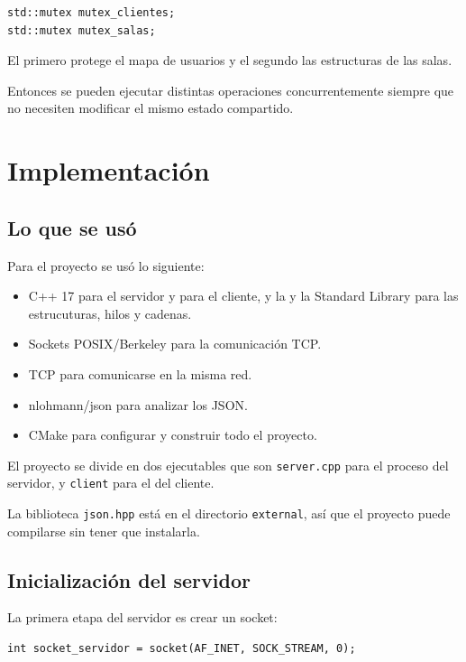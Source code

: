 \documentclass[12pt,letterpaper]{article}
\begin{document}
\begin{lstlisting}[style=cppstyle]
std::mutex mutex_clientes;
std::mutex mutex_salas;
\end{lstlisting}

El primero protege el mapa de usuarios y el segundo las estructuras de las salas.

Entonces se pueden ejecutar distintas operaciones concurrentemente siempre que no necesiten modificar el mismo estado compartido.


\section{Implementación}

\subsection{Lo que se usó}

Para el proyecto se usó lo siguiente:

\begin{itemize}
    \item C++ 17 para el servidor y para el cliente, y la y la Standard Library para las estrucuturas, hilos y cadenas.
    \item Sockets POSIX/Berkeley para la comunicación TCP.
    \item TCP para comunicarse en  la misma red.
    \item nlohmann/json para analizar los JSON.
    \item CMake para configurar y construir todo el proyecto.
\end{itemize}

El proyecto se divide en dos ejecutables que son \texttt{server.cpp} para el proceso del servidor, y \texttt{client} para el del cliente.

La biblioteca \texttt{json.hpp} está en el directorio \texttt{external}, así que el proyecto puede compilarse sin tener que instalarla.

\subsection{Inicialización del servidor}

La primera etapa del servidor es crear un socket:

\begin{lstlisting}[style=cppstyle]
int socket_servidor = socket(AF_INET, SOCK_STREAM, 0);
\end{lstlisting}
\end{document}
